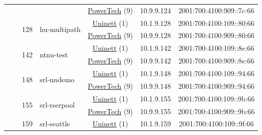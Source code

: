 \begin{small}
\begin{center}
\begin{longtable}{|c|c|c|c|c|c|c|c|}
  &  &  &  & \multicolumn{2}{|c|}{\tiny{\href{http://www.powertech.no}{PowerTech} (9)}} & \tiny{10.9.9.124} & \tiny{2001:700:4100:909::7c:66} \\* \cline{3-3}\cline{4-4}\cline{5-5}\cline{6-6}\cline{7-7}\cline{8-8}
  &  & \multirow{2}{*}{\tiny{128}} & \multicolumn{1}{|l|}{\multirow{2}{*}{\tiny{hu-multipath}}} & \multicolumn{2}{|c|}{\tiny{\href{https://www.uninett.no}{Uninett} (1)}} & \tiny{10.1.9.128} & \tiny{2001:700:4100:109::80:66} \\* \cline{5-5}\cline{6-6}\cline{7-7}\cline{8-8}
  &  &  &  & \multicolumn{2}{|c|}{\tiny{\href{http://www.powertech.no}{PowerTech} (9)}} & \tiny{10.9.9.128} & \tiny{2001:700:4100:909::80:66} \\* \cline{3-3}\cline{4-4}\cline{5-5}\cline{6-6}\cline{7-7}\cline{8-8}
  &  & \multirow{2}{*}{\tiny{142}} & \multicolumn{1}{|l|}{\multirow{2}{*}{\tiny{ntnu-test}}} & \multicolumn{2}{|c|}{\tiny{\href{https://www.uninett.no}{Uninett} (1)}} & \tiny{10.1.9.142} & \tiny{2001:700:4100:109::8e:66} \\* \cline{5-5}\cline{6-6}\cline{7-7}\cline{8-8}
  &  &  &  & \multicolumn{2}{|c|}{\tiny{\href{http://www.powertech.no}{PowerTech} (9)}} & \tiny{10.9.9.142} & \tiny{2001:700:4100:909::8e:66} \\* \cline{3-3}\cline{4-4}\cline{5-5}\cline{6-6}\cline{7-7}\cline{8-8}
  &  & \multirow{2}{*}{\tiny{148}} & \multicolumn{1}{|l|}{\multirow{2}{*}{\tiny{srl-nndemo}}} & \multicolumn{2}{|c|}{\tiny{\href{https://www.uninett.no}{Uninett} (1)}} & \tiny{10.1.9.148} & \tiny{2001:700:4100:109::94:66} \\* \cline{5-5}\cline{6-6}\cline{7-7}\cline{8-8}
  &  &  &  & \multicolumn{2}{|c|}{\tiny{\href{http://www.powertech.no}{PowerTech} (9)}} & \tiny{10.9.9.148} & \tiny{2001:700:4100:909::94:66} \\* \cline{3-3}\cline{4-4}\cline{5-5}\cline{6-6}\cline{7-7}\cline{8-8}
  &  & \multirow{2}{*}{\tiny{155}} & \multicolumn{1}{|l|}{\multirow{2}{*}{\tiny{srl-rserpool}}} & \multicolumn{2}{|c|}{\tiny{\href{https://www.uninett.no}{Uninett} (1)}} & \tiny{10.1.9.155} & \tiny{2001:700:4100:109::9b:66} \\* \cline{5-5}\cline{6-6}\cline{7-7}\cline{8-8}
  &  &  &  & \multicolumn{2}{|c|}{\tiny{\href{http://www.powertech.no}{PowerTech} (9)}} & \tiny{10.9.9.155} & \tiny{2001:700:4100:909::9b:66} \\* \cline{3-3}\cline{4-4}\cline{5-5}\cline{6-6}\cline{7-7}\cline{8-8}
  &  & \multirow{2}{*}{\tiny{159}} & \multicolumn{1}{|l|}{\multirow{2}{*}{\tiny{srl-seattle}}} & \multicolumn{2}{|c|}{\tiny{\href{https://www.uninett.no}{Uninett} (1)}} & \tiny{10.1.9.159} & \tiny{2001:700:4100:109::9f:66} \\* \cline{5-5}\cline{6-6}\cline{7-7}\cline{8-8}

\end{longtable}
\end{center}
\end{small}
